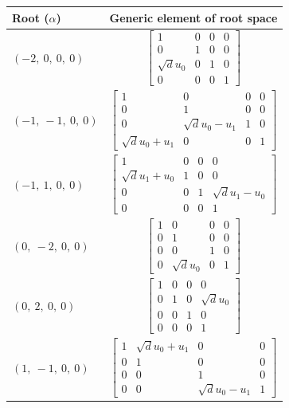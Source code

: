 \documentclass[11pt]{article}
\theoremstyle{definition}
\begin{document}
\noindent \begin{tabular}{|l|c|}
    \hline
    \textbf{Root ($\alpha$)} & \textbf{Generic element of root space} \\
    \hline
    $\left( -2, \  0, \  0, \  0\right)$ & $\left[\begin{matrix}1 & 0 & 0 & 0\\0 & 1 & 0 & 0\\\sqrt{d} u_{0} & 0 & 1 & 0\\0 & 0 & 0 & 1\end{matrix}\right]$ \\
    \hline
    $\left( -1, \  -1, \  0, \  0\right)$ & $\left[\begin{matrix}1 & 0 & 0 & 0\\0 & 1 & 0 & 0\\0 & \sqrt{d} u_{0} - u_{1} & 1 & 0\\\sqrt{d} u_{0} + u_{1} & 0 & 0 & 1\end{matrix}\right]$ \\
    \hline
    $\left( -1, \  1, \  0, \  0\right)$ & $\left[\begin{matrix}1 & 0 & 0 & 0\\\sqrt{d} u_{1} + u_{0} & 1 & 0 & 0\\0 & 0 & 1 & \sqrt{d} u_{1} - u_{0}\\0 & 0 & 0 & 1\end{matrix}\right]$ \\
    \hline
    $\left( 0, \  -2, \  0, \  0\right)$ & $\left[\begin{matrix}1 & 0 & 0 & 0\\0 & 1 & 0 & 0\\0 & 0 & 1 & 0\\0 & \sqrt{d} u_{0} & 0 & 1\end{matrix}\right]$ \\
    \hline
    $\left( 0, \  2, \  0, \  0\right)$ & $\left[\begin{matrix}1 & 0 & 0 & 0\\0 & 1 & 0 & \sqrt{d} u_{0}\\0 & 0 & 1 & 0\\0 & 0 & 0 & 1\end{matrix}\right]$ \\
    \hline
    $\left( 1, \  -1, \  0, \  0\right)$ & $\left[\begin{matrix}1 & \sqrt{d} u_{0} + u_{1} & 0 & 0\\0 & 1 & 0 & 0\\0 & 0 & 1 & 0\\0 & 0 & \sqrt{d} u_{0} - u_{1} & 1\end{matrix}\right]$ \\

\end{tabular}
\end{document}
